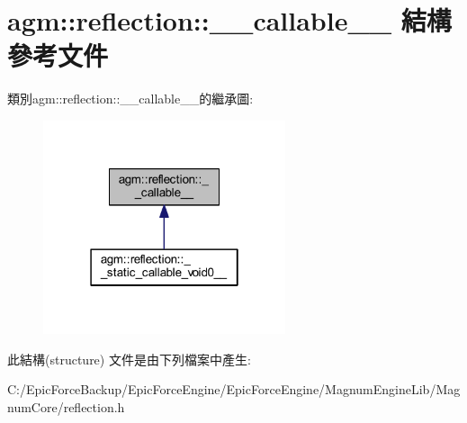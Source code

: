 \hypertarget{structagm_1_1reflection_1_1____callable____}{}\section{agm\+:\+:reflection\+:\+:\+\_\+\+\_\+callable\+\_\+\+\_\+ 結構 參考文件}
\label{structagm_1_1reflection_1_1____callable____}


類別agm\+:\+:reflection\+:\+:\+\_\+\+\_\+callable\+\_\+\+\_\+的繼承圖\+:\nopagebreak
\begin{figure}[H]
\begin{center}
\leavevmode
\includegraphics[width=202pt]{structagm_1_1reflection_1_1____callable______inherit__graph}
\end{center}
\end{figure}


此結構(structure) 文件是由下列檔案中產生\+:\begin{DoxyCompactItemize}
\item 
C\+:/\+Epic\+Force\+Backup/\+Epic\+Force\+Engine/\+Epic\+Force\+Engine/\+Magnum\+Engine\+Lib/\+Magnum\+Core/reflection.\+h\end{DoxyCompactItemize}
